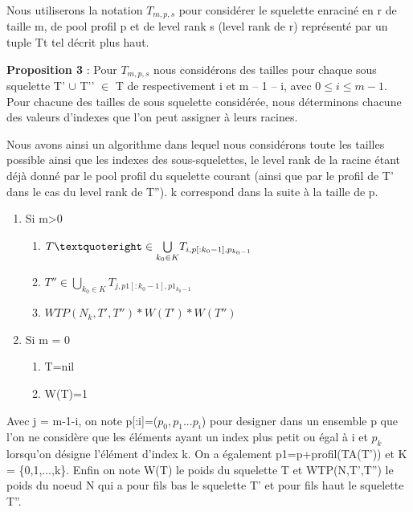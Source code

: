 \documentclass[french]{article}
\begin{document}
Nous utiliserons la notation \(T_{m,p,s} \) pour considérer le squelette enraciné en r de taille m, de pool profil p et de level rank s (level rank de r) représenté par un tuple Tt tel décrit plus haut.


\textbf{Proposition 3} :  Pour \(T_{m,p,s} \) nous considérons des tailles pour chaque sous squelette T’ \(\cup\) T’’ \(\in\) T de respectivement i et m – 1 – i, avec \(0\leq i\leq m-1\). Pour chacune des tailles de sous squelette considérée, nous déterminons chacune des valeurs d'indexes que l'on peut assigner à leurs racines.

Nous avons ainsi un algorithme dans lequel nous considérons toute les tailles possible ainsi que les indexes des sous-squelettes, le level rank de la racine étant déjà donné par le pool profil du squelette courant (ainsi que par le profil de T' dans le cas du level rank de T''). k correspond dans la suite à la taille de p.
\newpage
\begin{enumerate}
    \item Si m>0
        \begin{enumerate}
            \item
            \(T\textquoteright \in \underset{k_0\in K}{\bigcup} T_{i,p[:k_0-1],p_{k_0-1}} \)
            \item
            \(T'' \in \underset{k_0\in K}{\bigcup} T_{j,p1[:k_0-1],p1_{k_0-1}} \)
            \item
            $WTP(N_k,T',T'')*W(T')*W(T'')$
        \end{enumerate}
 
    \item Si m = 0
        \begin{enumerate} 
            \item
            T=nil 
            \item
            W(T)=1
        \end{enumerate}
\end{enumerate}
Avec j = m-1-i, on note p[:i]=(\(p_0,p_1...p_i\)) pour designer dans un ensemble p que l'on ne considère que les éléments ayant un index plus petit ou égal à i et \(p_{k}\) lorsqu'on désigne l'élément d'index k. On a également p1=p+profil(TA(T')) et K = \{0,1,...,k\}. Enfin on note W(T) le poids du squelette T et WTP(N,T',T'') le poids du noeud N qui a pour fils bas le squelette T' et pour fils haut le squelette T''.
\vspace{5mm} 
\end{document}
